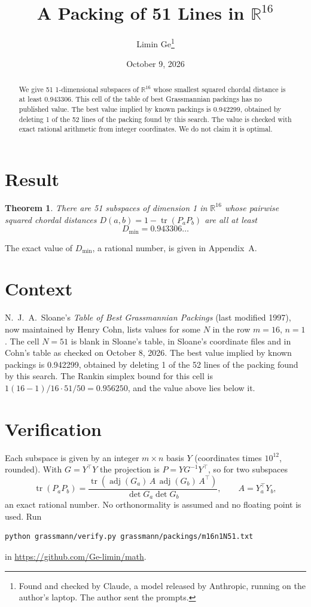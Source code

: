 \documentclass[11pt,a4paper]{article}
\title{A Packing of 51 Lines in $\mathbb{R}^{16}$}
\author{Limin Ge\thanks{Found and checked by Claude, a model released by Anthropic, running on the author's laptop. The author sent the prompts.}}
\date{October 9, 2026}
\newtheorem*{theorem}{Theorem}
\begin{document}
\maketitle
\begin{abstract}
We give 51 1-dimensional subspaces of $\mathbb{R}^{16}$ whose smallest squared chordal distance is at least 0.943306. This cell of the table of best Grassmannian packings has no published value. The best value implied by known packings is 0.942299, obtained by deleting 1 of the 52 lines of the packing found by this search. The value is checked with exact rational arithmetic from integer coordinates. We do not claim it is optimal.
\end{abstract}

\section{Result}
\begin{theorem}
There are 51 subspaces of dimension 1 in $\mathbb{R}^{16}$ whose pairwise squared chordal distances $D(a,b) = 1 - \operatorname{tr}(P_aP_b)$ are all at least
\[ D_{\min} = 0.943306\ldots \]
\end{theorem}
The exact value of $D_{\min}$, a rational number, is given in Appendix~A.


\section{Context}
N.~J.~A.~Sloane's \emph{Table of Best Grassmannian Packings} (last modified 1997), now maintained by Henry Cohn, lists values for some $N$ in the row $m=16$, $n=1$. The cell $N=51$ is blank in Sloane's table, in Sloane's coordinate files and in Cohn's table as checked on October 8, 2026. The best value implied by known packings is 0.942299, obtained by deleting 1 of the 52 lines of the packing found by this search. The Rankin simplex bound for this cell is $1(16-1)/16\cdot 51/50 = 0.956250$, and the value above lies below it.


\section{Verification}
Each subspace is given by an integer $m\times n$ basis $Y$ (coordinates times $10^{12}$, rounded). With $G=Y^\top Y$ the projection is $P=YG^{-1}Y^\top$, so for two subspaces
\[ \operatorname{tr}(P_aP_b)=\frac{\operatorname{tr}(\operatorname{adj}(G_a)\,A\,\operatorname{adj}(G_b)\,A^\top)}{\det G_a\det G_b},\qquad A=Y_a^\top Y_b, \]
an exact rational number. No orthonormality is assumed and no floating point is used. Run
\begin{verbatim}
python grassmann/verify.py grassmann/packings/m16n1N51.txt
\end{verbatim}
in \url{https://github.com/Ge-limin/math}.
\end{document}
